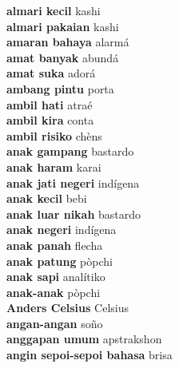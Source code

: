 \textbf{ almari kecil  } kashi \\
\textbf{ almari pakaian  } kashi \\
\textbf{ amaran bahaya  } alarmá \\
\textbf{ amat banyak  } abundá \\
\textbf{ amat suka  } adorá \\
\textbf{ ambang pintu  } porta \\
\textbf{ ambil hati  } atraé \\
\textbf{ ambil kira  } conta \\
\textbf{ ambil risiko  } chèns \\
\textbf{ anak gampang  } bastardo \\
\textbf{ anak haram  } karai \\
\textbf{ anak jati negeri  } indígena \\
\textbf{ anak kecil  } bebi \\
\textbf{ anak luar nikah  } bastardo \\
\textbf{ anak negeri  } indígena \\
\textbf{ anak panah  } flecha \\
\textbf{ anak patung  } pòpchi \\
\textbf{ anak sapi  } analítiko \\
\textbf{ anak-anak  } pòpchi \\
\textbf{ Anders Celsius  } Celsius \\
\textbf{ angan-angan  } soño \\
\textbf{ anggapan umum  } apstrakshon \\
\textbf{ angin sepoi-sepoi bahasa  } brisa \\
